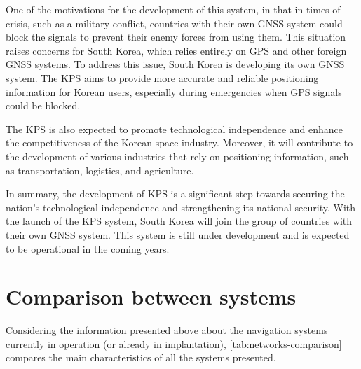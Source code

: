 
One of the motivations for the development of this system, in that in times of crisis, such as a military conflict, countries with their own GNSS system could block the signals to prevent their enemy forces from using them. This situation raises concerns for South Korea, which relies entirely on GPS and other foreign GNSS systems. To address this issue, South Korea is developing its own GNSS system. The KPS aims to provide more accurate and reliable positioning information for Korean users, especially during emergencies when GPS signals could be blocked.

The KPS is also expected to promote technological independence and enhance the competitiveness of the Korean space industry. Moreover, it will contribute to the development of various industries that rely on positioning information, such as transportation, logistics, and agriculture.

In summary, the development of KPS is a significant step towards securing the nation's technological independence and strengthening its national security. With the launch of the KPS system, South Korea will join the group of countries with their own GNSS system. This system is still under development and is expected to be operational in the coming years.

\section{Comparison between systems}

Considering the information presented above about the navigation systems currently in operation (or already in implantation), \autoref{tab:networks-comparison} compares the main characteristics of all the systems presented.

